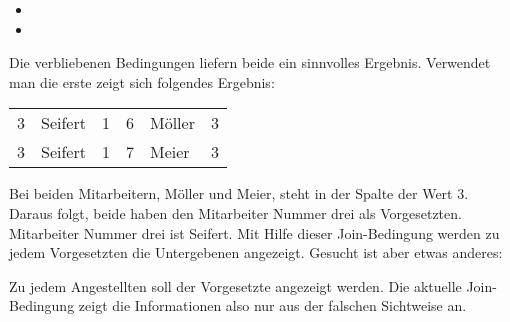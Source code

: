           \begin{itemize}
            \item {}
            \item {}
          \end{itemize}
          Die verbliebenen Bedingungen liefern beide ein sinnvolles Ergebnis. Verwendet man die erste  zeigt sich folgendes Ergebnis:
          \begin{center}
            \begin{small}
              \tablehead{}
              \tabletail {}
              \tablelasttail {}
              \begin{msoraclesql}
                \begin{supertabular}{rlrrlr}
                  3 & Seifert & 1 & 6 & Möller & 3 \\
                  3 & Seifert & 1 & 7 & Meier & 3 \\
                \end{supertabular}
              \end{msoraclesql}
            \end{small}
          \end{center}
          Bei beiden Mitarbeitern, Möller und Meier, steht in der Spalte  der Wert 3. Daraus folgt, beide haben den Mitarbeiter Nummer drei als Vorgesetzten. Mitarbeiter Nummer drei ist Seifert. Mit Hilfe dieser Join-Bedingung werden zu jedem Vorgesetzten die Untergebenen angezeigt. Gesucht ist aber etwas anderes:

          Zu jedem Angestellten soll der Vorgesetzte angezeigt werden. Die aktuelle Join-Bedingung zeigt die Informationen also nur aus der falschen Sichtweise an.

